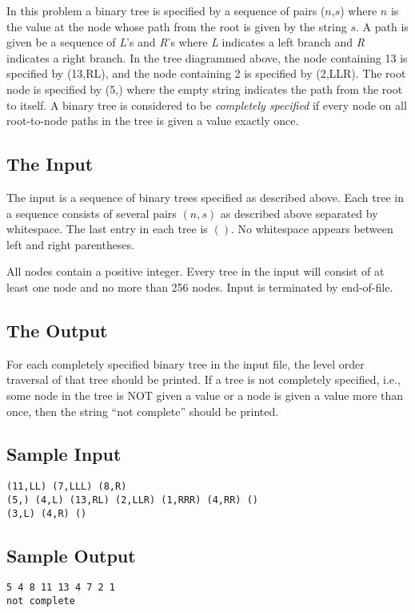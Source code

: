 In this problem a binary tree is specified by a sequence of pairs
($n$,$s$) where $n$ is the value at the node whose path from the root is
given by the string $s$.  A path is given be a sequence of {\em L}'s and
{\em R}'s where {\em L} indicates a left branch and {\em R} indicates a
right branch.  In the tree diagrammed above, the node containing 13 is
specified by (13,RL), and the node containing 2 is specified by (2,LLR).
The root node is specified by (5,) where the empty string indicates the
path from the root to itself.  A binary tree is considered to be
{\em completely specified} if every node on all root-to-node paths in
the tree is given a value exactly once.

\subsection*{The Input}

The input is a sequence of binary trees specified as described above.
Each tree in a sequence consists of several pairs $(n,s)$ as described
above separated by whitespace.  The last entry in each tree is $()$.  No
whitespace appears between left and right parentheses.

All nodes contain a positive integer.  Every tree in the input will
consist of at least one node and no more than 256 nodes.  Input is
terminated by end-of-file.

\subsection*{The Output}
For each completely specified binary tree in the input file, the level
order traversal of that tree should be printed.  If a tree is not
completely specified, i.e., some node in the tree is NOT given a value
or a node is given a value more than once, then the string ``not
complete'' should be printed.

\subsection*{Sample Input}
\begin{verbatim}
(11,LL) (7,LLL) (8,R)
(5,) (4,L) (13,RL) (2,LLR) (1,RRR) (4,RR) ()
(3,L) (4,R) ()
\end{verbatim}


\subsection*{Sample Output}
\begin{verbatim}
5 4 8 11 13 4 7 2 1
not complete
\end{verbatim}

